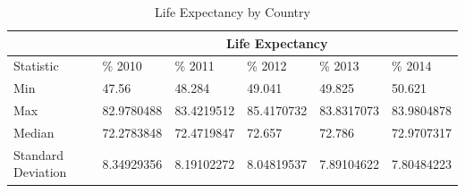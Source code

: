 \documentclass{article}
\begin{document}
\begin{multicols}{2}


\end{multicols}
\begin{table}[ht]
\centering
\begin{tabular}{|l|l|l|l|l|l|}
\hline
          &  \multicolumn{5}{c|}{Life Expectancy} \\ \hline
Statistic          &  \%  2010 &  \% 2011 &  \% 2012 &  \%  2013 & \% 2014 \\ \hline
Min                & 47.56                  & 48.284                 & 49.041                 & 49.825                 & 50.621                 \\ \hline
Max                & 82.9780488             & 83.4219512             & 85.4170732             & 83.8317073             & 83.9804878             \\ \hline
Median             & 72.2783848             & 72.4719847             & 72.657                 & 72.786                 & 72.9707317             \\ \hline
Standard Deviation & 8.34929356             & 8.19102272             & 8.04819537             & 7.89104622             & 7.80484223             \\ \hline
\end{tabular}
\caption{Life Expectancy by Country}
\label{summary-statistic-table-life}
\end{table}
\end{document}
